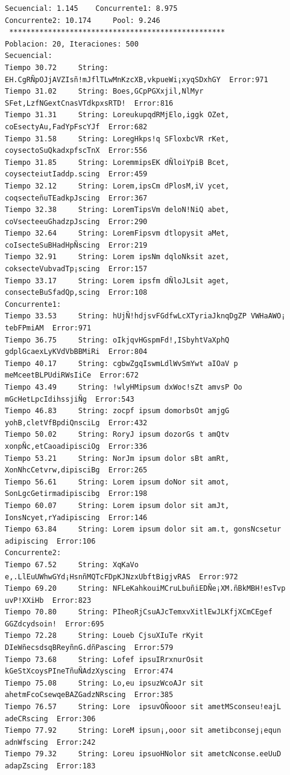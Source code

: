 \documentclass[a4paper,twocolumn,10pt]{article}
\begin{document}
\begin{center}
{\begin{verbatim}
Secuencial: 1.145	 Concurrente1: 8.975
Concurrente2: 10.174	 Pool: 9.246 
 **************************************************
Poblacion: 20, Iteraciones: 500
Secuencial:
Tiempo 30.72	 String: EH.CgRÑpOJjAVZIsñ!mJflTLwMnKzcXB,vkpueWi¡xyqSDxhGY	 Error:971
Tiempo 31.02	 String: Boes,GCpPGXxjil,NlMyr SFet,LzfNGextCnasVTdkpxsRTD!	 Error:816
Tiempo 31.31	 String: LoreukupqdRMjElo,iggk OZet, coEsectyAu,FadYpFscYJf	 Error:682
Tiempo 31.58	 String: LoregHkps!q SFloxbcVR rKet, coysectoSuQkadxpfscTnX	 Error:556
Tiempo 31.85	 String: LoremmipsEK dÑloiYpiB Bcet, coysecteiutIaddp.scing	 Error:459
Tiempo 32.12	 String: Lorem,ipsCm dPlosM,iV ycet, coqsecteñuTEadkpJscing	 Error:367
Tiempo 32.38	 String: LoremTipsVm deloN!NiQ abet, coVsecteeuGhadzpJscing	 Error:290
Tiempo 32.64	 String: LoremFipsvm dtlopysit aMet, coIsecteSuBHadHpÑscing	 Error:219
Tiempo 32.91	 String: Lorem ipsNm dqloNksit azet, coksecteVubvadTp¡scing	 Error:157
Tiempo 33.17	 String: Lorem ipsfm dÑloJLsit aget, consecteBuSfadQp,scing	 Error:108
Concurrente1:
Tiempo 33.53	 String: hUjÑ!hdjsvFGdfwLcXTyriaJknqDgZP VWHaAWO¡ tebFPmiAM	 Error:971
Tiempo 36.75	 String: oIkjqvHGspmFd!,ISbyhtVaXphQ gdplGcaexLyKVdVbBBMiRi	 Error:804
Tiempo 40.17	 String: cgbwZgqIswmLdlWvSmYwt aIOaV p meMceetBLPUdiRWsIiCe	 Error:672
Tiempo 43.49	 String: !wlyHMipsum dxWoc!sZt amvsP Oo mGcHetLpcIdihssjiÑg	 Error:543
Tiempo 46.83	 String: zocpf ipsum domorbsOt amjgG yohB,cletVfBpdiQnsciLg	 Error:432
Tiempo 50.02	 String: RoryJ ipsum dozorGs t amQtv xonpÑc,etCaoadipisciOg	 Error:336
Tiempo 53.21	 String: NorJm ipsum dolor sBt amRt, XonNhcCetvrw,dipisciBg	 Error:265
Tiempo 56.61	 String: Lorem ipsum doNor sit amot, SonLgcGetirmadipiscibg	 Error:198
Tiempo 60.07	 String: Lorem ipsum dolor sit amJt, IonsNcyet,rYadipiscing	 Error:146
Tiempo 63.84	 String: Lorem ipsum dolor sit am.t, gonsNcsetur adipiscing	 Error:106
Concurrente2:
Tiempo 67.52	 String: XqKaVo e,.LlEuUWhwGYd¡HsnñMQTcFDpKJNzxUbftBigjvRAS	 Error:972
Tiempo 69.20	 String: NFLeKahkouiMCruLbuñiEDÑe¡XM.ñBkMBH!esTvp uvP!XXiHb	 Error:823
Tiempo 70.80	 String: PIheoRjCsuAJcTemxvXitlEwJLKfjXCmCEgef GGZdcydsoin!	 Error:695
Tiempo 72.28	 String: Loueb CjsuXIuTe rKyit DIeWñecsdsqBReyñnG.dñPascing	 Error:579
Tiempo 73.68	 String: Lofef ipsuIRrxnurOsit kGeStXcoysPIneTñuÑAdzXyscing	 Error:474
Tiempo 75.08	 String: Lo,eu ipsuzWcoAJr sit ahetmFcoCsewqeBAZGadzNRscing	 Error:385
Tiempo 76.57	 String: Lore  ipsuvOÑooor sit ametMSconseu!eajL adeCRscing	 Error:306
Tiempo 77.92	 String: LoreM ipsun¡,ooor sit ametibconsej¡equn adnWfscing	 Error:242
Tiempo 79.32	 String: Loreu ipsuoHNolor sit ametcNconse.eeUuD adapZscing	 Error:183

\end{verbatim}}
\end{center}
\end{document}
